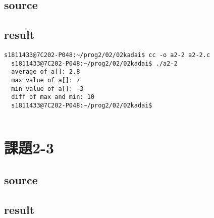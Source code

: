 \documentclass[10pt,a4paper]{jsarticle}
\begin{document}
\subsection{source}



\subsection{result}
\begin{lstlisting}[basicstyle=\ttfamily\footnotesize,frame=single]
  s1811433@7C202-P048:~/prog2/02/02kadai$ cc -o a2-2 a2-2.c
  s1811433@7C202-P048:~/prog2/02/02kadai$ ./a2-2
  average of a[]: 2.8
  max value of a[]: 7
  min value of a[]: -3
  diff of max and min: 10
  s1811433@7C202-P048:~/prog2/02/02kadai$
  
\end{lstlisting}

\section{課題2-3}
\subsection{source}


\subsection{result}
\end{document}
